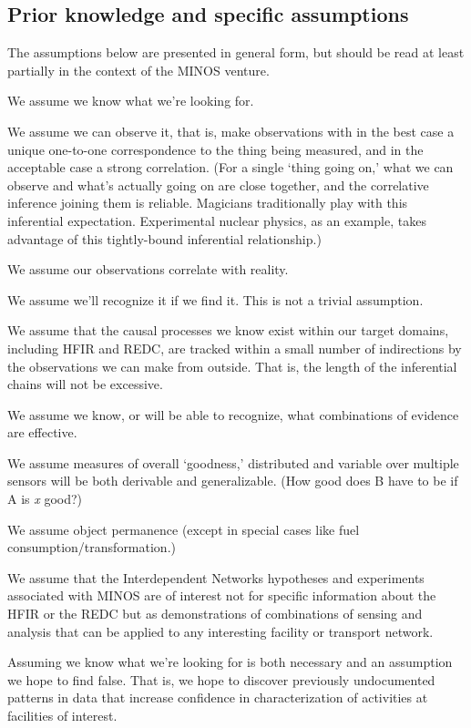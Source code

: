 \documentclass{article} %
\begin{document}
\subsection{Prior knowledge and specific assumptions}
The assumptions below are presented in general form, but should be read at least partially in the context of the MINOS venture.
\begin{itemize*}
\item We assume we know what we're looking for. 
\item We assume we can observe it, that is, make observations with in the best case a unique one-to-one correspondence to the thing being measured, and in the acceptable case a strong correlation. (For a single `thing going on,' what we can observe and what's actually going on are close together, and the correlative inference joining them is reliable. Magicians traditionally play with this inferential expectation. Experimental nuclear physics, as an example, takes advantage of this tightly-bound inferential relationship.)
\item We assume our observations correlate with reality. 
\item We assume we'll recognize it if we find it. This is not a trivial assumption.
\item We assume that the causal processes we know exist within our target domains, including HFIR and REDC, are tracked within a small number of indirections by the observations we can make from outside. That is, the length of the inferential chains will not be excessive.
\item We assume we know, or will be able to recognize, what combinations of evidence are effective. 
\item We assume measures of overall `goodness,' distributed and variable over multiple sensors will be both derivable and generalizable. (How good does B have to be if A is \textit{x} good?)
\item We assume object permanence (except in special cases like fuel consumption/transformation.)
\end{itemize*}

We assume that the Interdependent Networks hypotheses and experiments associated with MINOS are of interest not for specific information about the HFIR or the REDC but as demonstrations of combinations of sensing and analysis that can be applied to any interesting facility or transport network.

Assuming we know what we're looking for is both necessary and an assumption we hope to find false. That is, we hope to discover previously undocumented patterns in data that increase confidence in characterization of activities at facilities of interest. 
\end{document}
